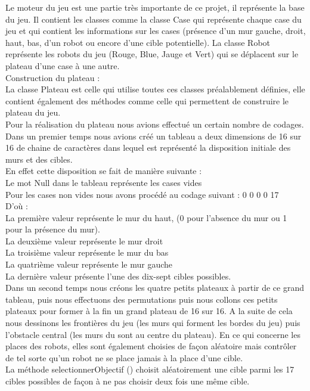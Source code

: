 \documentclass[12pt]{article}
\begin{document}
			Le moteur du jeu est une partie très importante de ce projet, il représente la base du jeu. Il contient les classes comme la classe Case qui représente chaque case du jeu et qui contient les informations sur les cases (présence d’un mur gauche, droit, haut, bas, d’un robot ou encore d’une cible potentielle). La classe Robot représente les robots du jeu (Rouge, Blue, Jauge et Vert) qui se déplacent sur le plateau d’une case à une autre. 
			\\Construction du plateau :
			\\La classe Plateau est celle qui utilise toutes ces classes préalablement définies, elle contient également des méthodes comme celle qui permettent de construire le plateau du jeu.
			\\Pour la réalisation du plateau nous avions effectué un certain nombre de codages.
			\\Dans un premier temps nous avions créé un tableau a deux dimensions de 16 sur 16 de chaine de caractères dans lequel est représenté la disposition initiale des murs et des cibles. 
			\\En effet cette disposition se fait de manière suivante :
			\\Le mot Null dans le tableau représente les cases vides
			\\Pour les cases non vides nous avons procédé au codage suivant : 0 0 0 0 17
			\\D’où 
:
			\\La première valeur représente le mur du haut, (0 pour l’absence du mur ou 1 pour la présence du mur).
			\\La deuxième valeur représente le mur droit 
			\\La troisième valeur représente le mur du bas
			\\La quatrième valeur représente le mur gauche
			\\La dernière valeur présente l’une des dix-sept cibles possibles.
			\\Dans un second temps nous créons les quatre petits plateaux à partir de ce grand tableau, puis nous effectuons des permutations puis nous collons ces petits plateaux pour former à la fin un grand plateau de 16 sur 16. A la suite de cela nous dessinons les frontières du jeu (les murs qui forment les bordes du jeu) puis l’obstacle central (les murs du sont au centre du plateau). En ce qui concerne les places des robots, elles sont également choisies de façon aléatoire mais contrôler de tel sorte qu’un robot ne se place jamais à la place d’une cible.
			\\La méthode selectionnerObjectif () choisit aléatoirement une cible parmi les 17 cibles possibles de façon à ne pas choisir deux fois une même cible.
			
\end{document}
